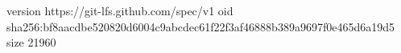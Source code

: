version https://git-lfs.github.com/spec/v1
oid sha256:bf8aacdbe520820d6004c9abcdec61f22f3af46888b389a9697f0e465d6a19d5
size 21960

